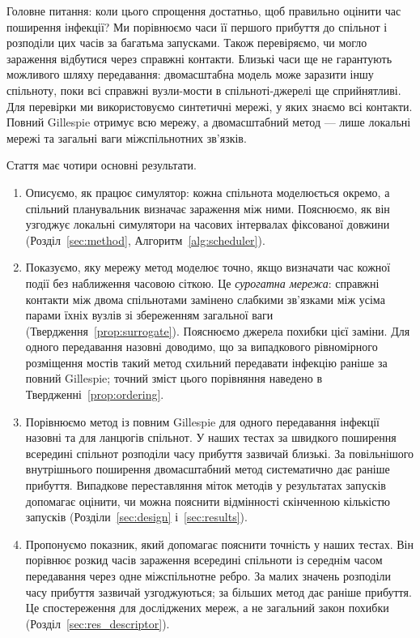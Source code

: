Головне питання: коли цього спрощення достатньо, щоб правильно оцінити час поширення інфекції? Ми порівнюємо часи її першого прибуття до спільнот і розподіли цих часів за багатьма запусками. Також перевіряємо, чи могло зараження відбутися через справжні контакти. Близькі часи ще не гарантують можливого шляху передавання: двомасштабна модель може заразити іншу спільноту, поки всі справжні вузли-мости в спільноті-джерелі ще сприйнятливі. Для перевірки ми використовуємо синтетичні мережі, у яких знаємо всі контакти. Повний Gillespie отримує всю мережу, а двомасштабний метод --- лише локальні мережі та загальні ваги міжспільнотних зв'язків.

Стаття має чотири основні результати.
\begin{enumerate}
\item Описуємо, як працює симулятор: кожна спільнота моделюється окремо, а спільний планувальник визначає зараження між ними. Пояснюємо, як він узгоджує локальні симулятори на часових інтервалах фіксованої довжини (Розділ~\ref{sec:method}, Алгоритм~\ref{alg:scheduler}).
\item Показуємо, яку мережу метод моделює точно, якщо визначати час кожної події без наближення часовою сіткою. Це \emph{сурогатна мережа}: справжні контакти між двома спільнотами замінено слабкими зв'язками між усіма парами їхніх вузлів зі збереженням загальної ваги (Твердження~\ref{prop:surrogate}). Пояснюємо джерела похибки цієї заміни. Для одного передавання назовні доводимо, що за випадкового рівномірного розміщення мостів такий метод схильний передавати інфекцію раніше за повний Gillespie; точний зміст цього порівняння наведено в Твердженні~\ref{prop:ordering}.
\item Порівнюємо метод із повним Gillespie для одного передавання інфекції назовні та для ланцюгів спільнот. У наших тестах за швидкого поширення всередині спільнот розподіли часу прибуття зазвичай близькі. За повільнішого внутрішнього поширення двомасштабний метод систематично дає раніше прибуття. Випадкове переставляння міток методів у результатах запусків допомагає оцінити, чи можна пояснити відмінності скінченною кількістю запусків (Розділи~\ref{sec:design} і~\ref{sec:results}).
\item Пропонуємо показник, який допомагає пояснити точність у наших тестах. Він порівнює розкид часів зараження всередині спільноти із середнім часом передавання через одне міжспільнотне ребро. За малих значень розподіли часу прибуття зазвичай узгоджуються; за більших метод дає раніше прибуття. Це спостереження для досліджених мереж, а не загальний закон похибки (Розділ~\ref{sec:res_descriptor}).
\end{enumerate}

